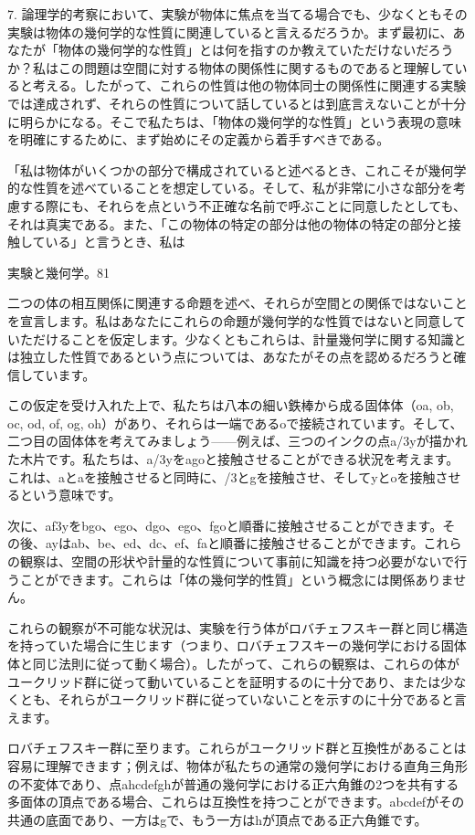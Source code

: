 \documentclass[a4paper,11pt,openany]{ltjsbook}
\begin{document}
7. 論理学的考察において、実験が物体に焦点を当てる場合でも、少なくともその実験は物体の幾何学的な性質に関連していると言えるだろうか。まず最初に、あなたが「物体の幾何学的な性質」とは何を指すのか教えていただけないだろうか？私はこの問題は空間に対する物体の関係性に関するものであると理解していると考える。したがって、これらの性質は他の物体同士の関係性に関連する実験では達成されず、それらの性質について話しているとは到底言えないことが十分に明らかになる。そこで私たちは、「物体の幾何学的な性質」という表現の意味を明確にするために、まず始めにその定義から着手すべきである。

「私は物体がいくつかの部分で構成されていると述べるとき、これこそが幾何学的な性質を述べていることを想定している。そして、私が非常に小さな部分を考慮する際にも、それらを点という不正確な名前で呼ぶことに同意したとしても、それは真実である。また、「この物体の特定の部分は他の物体の特定の部分と接触している」と言うとき、私は

実験と幾何学。81

二つの体の相互関係に関連する命題を述べ、それらが空間との関係ではないことを宣言します。私はあなたにこれらの命題が幾何学的な性質ではないと同意していただけることを仮定します。少なくともこれらは、計量幾何学に関する知識とは独立した性質であるという点については、あなたがその点を認めるだろうと確信しています。

この仮定を受け入れた上で、私たちは八本の細い鉄棒から成る固体体（oa, ob, oc, od, of, og, oh）があり、それらは一端であるoで接続されています。そして、二つ目の固体体を考えてみましょう——例えば、三つのインクの点a/3yが描かれた木片です。私たちは、a/3yをagoと接触させることができる状況を考えます。これは、aとaを接触させると同時に、/3とgを接触させ、そしてyとoを接触させるという意味です。

次に、af3yをbgo、ego、dgo、ego、fgoと順番に接触させることができます。その後、ayはab、be、ed、dc、ef、faと順番に接触させることができます。これらの観察は、空間の形状や計量的な性質について事前に知識を持つ必要がないで行うことができます。これらは「体の幾何学的性質」という概念には関係ありません。

これらの観察が不可能な状況は、実験を行う体がロバチェフスキー群と同じ構造を持っていた場合に生じます（つまり、ロバチェフスキーの幾何学における固体体と同じ法則に従って動く場合）。したがって、これらの観察は、これらの体がユークリッド群に従って動いていることを証明するのに十分であり、または少なくとも、それらがユークリッド群に従っていないことを示すのに十分であると言えます。

ロバチェフスキー群に至ります。これらがユークリッド群と互換性があることは容易に理解できます；例えば、物体が私たちの通常の幾何学における直角三角形の不変体であり、点ahcdefghが普通の幾何学における正六角錐の2つを共有する多面体の頂点である場合、これらは互換性を持つことができます。abcdefがその共通の底面であり、一方はgで、もう一方はhが頂点である正六角錐です。
\end{document}
